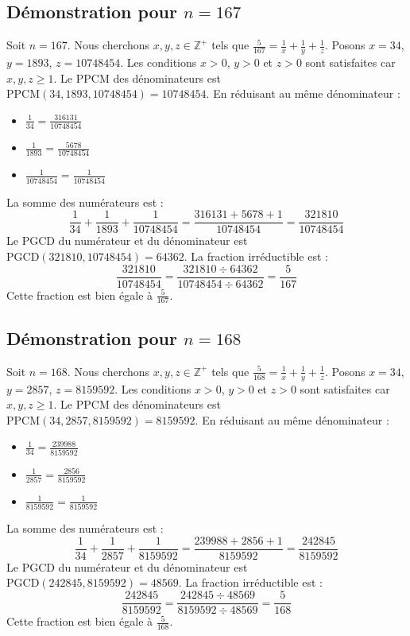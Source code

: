 \documentclass[11pt,a4paper]{article}
\begin{document}
\subsection{Démonstration pour $n = 167$}
Soit $n = 167$. Nous cherchons $x, y, z \in \mathbb{Z}^{+}$ tels que $\frac{5}{167} = \frac{1}{x} + \frac{1}{y} + \frac{1}{z}$.
Posons $x = 34$, $y = 1893$, $z = 10748454$.
Les conditions $x > 0$, $y > 0$ et $z > 0$ sont satisfaites car $x, y, z \geq 1$.
Le PPCM des dénominateurs est $\text{PPCM}(34, 1893, 10748454) = 10748454$.
En réduisant au même dénominateur :
\begin{itemize}
    \item $\frac{1}{34} = \frac{316131}{10748454}$
    \item $\frac{1}{1893} = \frac{5678}{10748454}$
    \item $\frac{1}{10748454} = \frac{1}{10748454}$
\end{itemize}
La somme des numérateurs est :
$$ \frac{1}{34} + \frac{1}{1893} + \frac{1}{10748454} = \frac{316131 + 5678 + 1}{10748454} = \frac{321810}{10748454} $$
Le PGCD du numérateur et du dénominateur est $\text{PGCD}(321810, 10748454) = 64362$.
La fraction irréductible est :
$$ \frac{321810}{10748454} = \frac{321810 \div 64362}{10748454 \div 64362} = \frac{5}{167} $$
Cette fraction est bien égale à $\frac{5}{167}$.

\subsection{Démonstration pour $n = 168$}
Soit $n = 168$. Nous cherchons $x, y, z \in \mathbb{Z}^{+}$ tels que $\frac{5}{168} = \frac{1}{x} + \frac{1}{y} + \frac{1}{z}$.
Posons $x = 34$, $y = 2857$, $z = 8159592$.
Les conditions $x > 0$, $y > 0$ et $z > 0$ sont satisfaites car $x, y, z \geq 1$.
Le PPCM des dénominateurs est $\text{PPCM}(34, 2857, 8159592) = 8159592$.
En réduisant au même dénominateur :
\begin{itemize}
    \item $\frac{1}{34} = \frac{239988}{8159592}$
    \item $\frac{1}{2857} = \frac{2856}{8159592}$
    \item $\frac{1}{8159592} = \frac{1}{8159592}$
\end{itemize}
La somme des numérateurs est :
$$ \frac{1}{34} + \frac{1}{2857} + \frac{1}{8159592} = \frac{239988 + 2856 + 1}{8159592} = \frac{242845}{8159592} $$
Le PGCD du numérateur et du dénominateur est $\text{PGCD}(242845, 8159592) = 48569$.
La fraction irréductible est :
$$ \frac{242845}{8159592} = \frac{242845 \div 48569}{8159592 \div 48569} = \frac{5}{168} $$
Cette fraction est bien égale à $\frac{5}{168}$.
\end{document}
